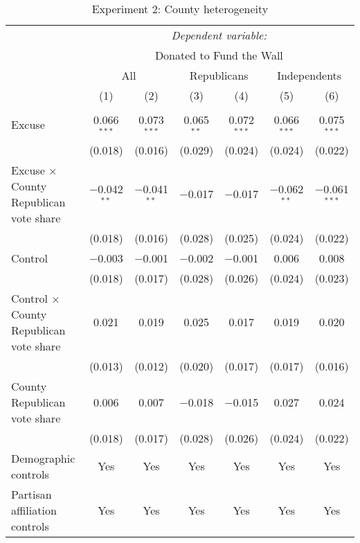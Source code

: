 
\begin{table}[!htbp] \centering 
  \caption{Experiment 2: County heterogeneity} 
  \label{t:2-cityheterogeneity} 
\begin{threeparttable}
\begin{tabular}{@{\hspace{5pt}}l@{\hspace{5pt}}cccccc} 
\toprule 
 & \multicolumn{6}{c}{\textit{Dependent variable:}} \\ 
\cmidrule(rr){2-7} 
 & \multicolumn{6}{c}{Donated to Fund the Wall} \\ 
 \cmidrule(rr){2-7}
 & \multicolumn{2}{c}{All} & \multicolumn{2}{c}{Republicans} & \multicolumn{2}{c}{Independents} \\ 
 & (1) & (2) & (3) & (4) & (5) & (6)\\ 
\midrule  
\\[-2.1ex] Excuse & 0.066$^{***}$ & 0.073$^{***}$ & 0.065$^{**}$ & 0.072$^{***}$ & 0.066$^{***}$ & 0.075$^{***}$ \\ 
  & (0.018) & (0.016) & (0.029) & (0.024) & (0.024) & (0.022) \\ 
 \addlinespace 
 Excuse $\times$ County Republican vote share & $-$0.042$^{**}$ & $-$0.041$^{**}$ & $-$0.017 & $-$0.017 & $-$0.062$^{**}$ & $-$0.061$^{***}$ \\ 
  & (0.018) & (0.016) & (0.028) & (0.025) & (0.024) & (0.022) \\ 
 \addlinespace 
 Control & $-$0.003 & $-$0.001 & $-$0.002 & $-$0.001 & 0.006 & 0.008 \\ 
  & (0.018) & (0.017) & (0.028) & (0.026) & (0.024) & (0.023) \\ 
 \addlinespace 
 Control $\times$ County Republican vote share & 0.021 & 0.019 & 0.025 & 0.017 & 0.019 & 0.020 \\ 
  & (0.013) & (0.012) & (0.020) & (0.017) & (0.017) & (0.016) \\ 
 \addlinespace 
 County Republican vote share & 0.006 & 0.007 & $-$0.018 & $-$0.015 & 0.027 & 0.024 \\ 
  & (0.018) & (0.017) & (0.028) & (0.026) & (0.024) & (0.022) \\ 
 \addlinespace 
\midrule  
Demographic controls & Yes & Yes & Yes & Yes & Yes & Yes \\ 
Partisan affiliation controls & Yes & Yes & Yes & Yes & Yes & Yes \\ 

\end{tabular}
\end{threeparttable}
\end{table}
